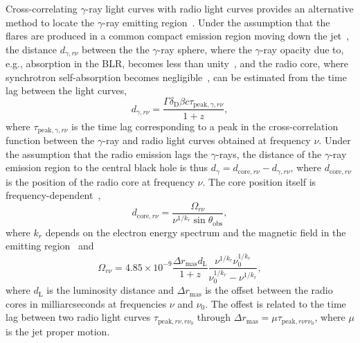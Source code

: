 \documentclass[twocolumn]{aastex62}
\newcommand{\Grays}{$\gamma$-rays\xspace}
\newcommand{\gray}{$\gamma$-ray\xspace}
\begin{document}
Cross-correlating \gray light curves with radio light curves provides an alternative method to locate the \gray emitting region~\citep[e.g.,][]{2014MNRAS.441.1899F}.
Under the assumption that the flares are produced in a common compact emission  region moving down the jet~\citep[e.g.,][]{2014MNRAS.445..428M},
the distance $d_{\gamma,r\nu}$ between the 
the \gray sphere, where the \gray opacity due to, e.g., absorption in the BLR, becomes less than unity~\citep{1995ApJ...441...79B}, and the 
radio core, where synchrotron self-absorption becomes negligible~\citep[][]{1981ApJ...243..700K}, 
can be estimated from the time lag between the light curves, 
\begin{equation}
    d_{\gamma,r\nu} = \frac{\Gamma\delta_\mathrm{D}\beta c\tau_{\mathrm{peak},\gamma,r\nu}}{1 + z},
    \label{eq:dgamma-r}
\end{equation}
where $\tau_{\mathrm{peak},\gamma,r\nu}$ is the time lag corresponding to a peak in the cross-correlation function between the \gray and radio light curves obtained at frequency $\nu$.
Under the assumption that the radio emission lags the \Grays, the distance of the \gray emission region to the central black hole is thus $d_\gamma = d_{\mathrm{core},r\nu} - d_{\gamma,r\nu}$, where $d_{\mathrm{core},r\nu}$ is the position of the radio core at frequency $\nu$.
The core position itself is frequency-dependent~\citep[the core shift effect; see, e.g.,][]{1998A&A...330...79L},
\begin{equation}
    d_{\mathrm{core},r\nu} = \frac{\Omega_{r\nu}}{\nu^{1/k_r}\sin\theta_\mathrm{obs}},
     \label{eq:core-shift1}
\end{equation}
where $k_r$ depends on the electron energy spectrum and the magnetic field in the emitting region~\citep{1981ApJ...243..700K} and
\begin{equation}
    \Omega_{r\nu} = 4.85\times10^{-9} \frac{\Delta r_\mathrm{mas} d_\mathrm{L}}{1 + z}\frac{\nu^{1/k_r}\nu_0^{1/k_r}}{\nu_0^{1/k_r}-\nu^{1/k_r}},
    \label{eq:core-shift2}
\end{equation}
where $d_\mathrm{L}$ is the luminosity distance and $\Delta r_\mathrm{mas}$ is the offset between the radio cores in milliarcseconds at frequencies $\nu$ and $\nu_0$. 
The offest is related to the time lag between two radio light curves $\tau_{\mathrm{peak},r\nu,r\nu_0}$ through 
$\Delta r_\mathrm{mas} = \mu \tau_{\mathrm{peak},r\nu r\nu_0}$, where $\mu$ is the jet proper motion. 
\end{document}
